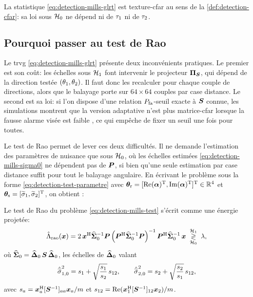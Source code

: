 \begin{property}
\label{prop:detection-mills-cfar}
  La statistique \cref{eq:detection-mills-glrt} est texture-cfar au sens de la \cref{def:detection-cfar}: sa loi sous $\mathcal{H}_0$ ne dépend ni de $\tau_1$ ni de $\tau_2$.
\end{property}

\subsection{Pourquoi passer au test de Rao}
\label{subsec:detection-mills-rao}

Le trvg \cref{eq:detection-mills-glrt} présente deux inconvénients pratiques. Le premier est son coût: les échelles sous $\mathcal{H}_1$ font intervenir le projecteur $\boldsymbol{\Pi}_{\boldsymbol{S}}$, qui dépend de la direction testée $(\theta_1,\theta_2)$. Il faut donc les recalculer pour chaque couple de directions, alors que le balayage porte sur $64\times64$ couples par case distance. Le second est sa loi: si l'on dispose d'une relation $P_{\mathrm{fa}}$-seuil exacte à $\boldsymbol{S}$ connue, les simulations montrent que la version adaptative n'est plus matrice-cfar lorsque la fausse alarme visée est faible \cite{JOE24}, ce qui empêche de fixer un seuil une fois pour toutes.

Le test de Rao permet de lever ces deux difficultés. Il ne demande l'estimation des paramètres de nuisance que sous $\mathcal{H}_0$, où les échelles estimées \cref{eq:detection-mills-sigma0} ne dépendent pas de $\boldsymbol{P}$, si bien qu'une seule estimation par case distance suffit pour tout le balayage angulaire. En écrivant le problème sous la forme \cref{eq:detection-test-parametre} avec $\boldsymbol{\theta}_{\mathrm{r}}=[\operatorname{\operatorname{Re}}(\boldsymbol{\alpha})^{\mathrm{T}},\operatorname{Im}(\boldsymbol{\alpha})^{\mathrm{T}}]^{\mathrm{T}}\in\mathbb{R}^4$ et $\boldsymbol{\theta}_{\mathrm{s}}=[\widetilde{\sigma}_1,\widetilde{\sigma}_2]^{\mathrm{T}}$, on obtient :

\begin{proposition}
\label{prop:detection-mills-rao}
  Le test de Rao du problème \cref{eq:detection-mills-test} s'écrit comme une énergie projetée:
  \begin{equation}
    \hat{\Lambda}_{\mathrm{rao}}(\boldsymbol{x})
    =
    2\,\boldsymbol{x}^{\mathrm{H}}{\widehat{\boldsymbol{\Sigma}}_0}^{-1}\boldsymbol{P}
    \left(\boldsymbol{P}^{\mathrm{H}}{\widehat{\boldsymbol{\Sigma}}_0}^{-1}\boldsymbol{P}\right)^{-1}
    \boldsymbol{P}^{\mathrm{H}}{\widehat{\boldsymbol{\Sigma}}_0}^{-1}\,\boldsymbol{x}
    \;\underset{\mathcal{H}_0}{\overset{\mathcal{H}_1}{\gtrless}}\; \lambda,
    \label{eq:detection-mills-rao}
  \end{equation}
  où $\widehat{\boldsymbol{\Sigma}}_0 = \widehat{\boldsymbol{\Delta}}_0\,\boldsymbol{S}\,\widehat{\boldsymbol{\Delta}}_0$, les échelles de $\widehat{\boldsymbol{\Delta}}_0$ valant
  \begin{equation}
    \hat{\widetilde{\sigma}}_{1,0}^2 = s_1 + \sqrt{\frac{s_1}{s_2}}\,s_{12},
    \qquad
    \hat{\widetilde{\sigma}}_{2,0}^2 = s_2 + \sqrt{\frac{s_2}{s_1}}\,s_{12},
    \label{eq:detection-mills-echelles-h0}
  \end{equation}
  avec $s_a = \boldsymbol{x}_a^{\mathrm{H}}[{\boldsymbol{S}}^{-1}]_{aa}\boldsymbol{x}_a/m$ et $s_{12}=\operatorname{\operatorname{Re}}(\boldsymbol{x}_1^{\mathrm{H}}[{\boldsymbol{S}}^{-1}]_{12}\boldsymbol{x}_2)/m$.
\end{proposition}

